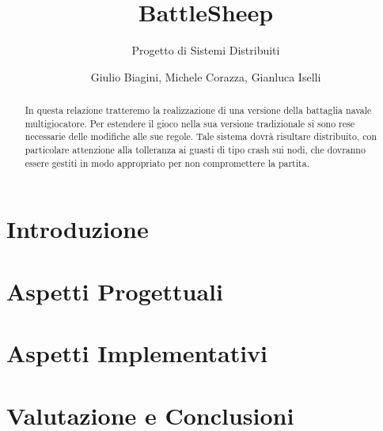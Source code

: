 \documentclass[a4paper,10pt]{scrartcl}
\begin{document}
\title{BattleSheep}
\subtitle{Progetto di Sistemi Distribuiti}
\author{Giulio Biagini, Michele Corazza, Gianluca Iselli}
\maketitle

\begin{abstract}
In questa relazione tratteremo la realizzazione di una versione della battaglia
navale multigiocatore. Per estendere il gioco nella sua versione tradizionale si sono rese
necessarie delle modifiche alle sue regole. 
Tale sistema dovrà risultare distribuito, con particolare attenzione
alla tolleranza ai guasti di tipo crash sui nodi, che dovranno essere gestiti
in modo appropriato per non compromettere la partita.
\end{abstract}

\section{Introduzione}


\section{Aspetti Progettuali}




\section{Aspetti Implementativi}
%
%



\section{Valutazione e Conclusioni}

\end{document}
